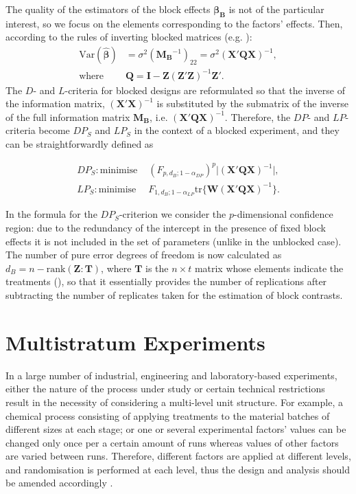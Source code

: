 The quality of the estimators of the block effects $\bm{\beta_B}$ is not of the particular interest, so we focus on the elements corresponding to the factors' effects. Then, according to the rules of inverting blocked matrices (e.g. \citealp{Harville2006matrix}):
\begin{align*}
\mbox{Var}(\hat{\bm{\beta}})&=\sigma^2(\bm{M_B}^{-1})_{22}=\sigma^2(\bm{X}'\bm{QX})^{-1},\\
\mbox{where }&\bm{Q}=\bm{I}-\bm{Z}(\bm{Z}'\bm{Z})^{-1}\bm{Z}'.
\end{align*}
The $D$- and $L$-criteria for blocked designs are reformulated so that the inverse of the information matrix, $(\bm{X}'\bm{X})^{-1}$ is substituted by the submatrix of the inverse of the full information matrix $\bm{M_B}$, i.e. $(\bm{X}'\bm{QX})^{-1}.$ Therefore, the $DP$- and $LP$-criteria become $DP_S$ and $LP_S$ in the context of a blocked experiment, and they can be straightforwardly defined as

\begin{align}
\label{eq::DPs_blocked}
DP_S: \mbox{minimise } &(F_{p,d_B;1-\alpha_{DP}})^{p}\vert (\bm{X}'\bm{Q}\bm{X})^{-1}\vert,\\
\label{eq::LPs_blocked}
LP_S: \mbox{minimise } &F_{1,d_B;1-\alpha_{LP}}\mbox{tr}\{\bm{W}(\bm{X}'\bm{Q}\bm{X})^{-1}\}.
\end{align}

In the formula for the $DP_S$-criterion we consider the $p$-dimensional confidence region: due to the redundancy of the intercept in the presence of fixed block effects it is not included in the set of parameters (unlike in the unblocked case). The number of pure error degrees of freedom is now calculated as $d_B=n-\mbox{rank}(\bm{Z}:\bm{T})$, where $\bm{T}$ is the $n\times t$ matrix whose elements indicate the treatments (\citealp{GilmourTrinca2012}), so that it essentially provides the number of replications after subtracting the number of replicates taken for the estimation of block contrasts.  


\section{Multistratum Experiments}
\label{sec::back_ms}
In a large number of industrial, engineering and laboratory-based experiments, either the nature of the process under study or certain technical restrictions result in the necessity of considering a multi-level unit structure. For example, a chemical process consisting of applying treatments to the material batches of different sizes at each stage;  or one or several experimental factors' values can be changed only once per a certain amount of runs whereas values of other factors are varied between runs. Therefore, different factors are applied at different levels, and randomisation is performed at each level, thus the design and analysis  should be amended accordingly \citep{MeadGilmour2012}.

